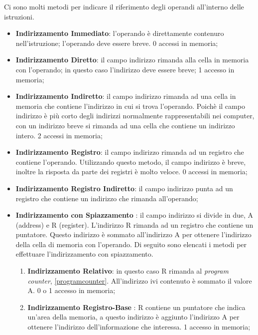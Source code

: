 \documentclass{article}
\begin{document}
Ci sono molti metodi per indicare il riferimento degli operandi all'interno delle istruzioni.
\begin{itemize}
	\item \textbf{Indirizzamento Immediato}: l'operando è direttamente contenuro nell'istruzione; l'operando deve essere breve. 0 accessi in memoria;

	\item \textbf{Indirizzamento Diretto}: il campo indirizzo rimanda alla cella in memoria con l'operando; in questo caso l'indirizzo deve essere breve; 1 accesso in memoria;

	\item \textbf{Indirizzamento Indiretto}: il campo indirizzo  rimanda ad una cella in memoria che contiene l'indirizzo in cui si trova l'operando. Poichè il campo indirizzo è più corto degli indirizzi normalmente rappresentabili nei computer, con un indirizzo breve si rimanda ad una cella che contiene un indirizzo intero. 2 accessi in memoria;

	\item \textbf{Indirizzamento Registro}: il campo indirizzo rimanda ad un registro che contiene l'operando. Utilizzando questo metodo, il campo indirizzo è breve, inoltre la risposta da parte dei registri è molto veloce. 0 accessi in memoria;

	\item \textbf{Indirizzamento Registro Indiretto}: il campo indirizzo punta ad un registro che contiene un indirizzo che rimanda all'operando;

	\item \textbf{Indirizzamento con Spiazzamento} \label{spiazzamento}: il campo indirizzo si divide in due, A (address) e R (register). L'indirizzo R rimanda ad un registro che contiene un puntatore. Questo indirizzo è sommato all'indirizzo A per ottenere l'indirizzo della cella di memoria con l'operando. Di seguito sono elencati i metodi per effettuare l'indirizzamento con spiazzamento.

	\begin{enumerate}
		\item \textbf{Indirizzamento Relativo}: in questo caso R rimanda al \textit{program counter}, \autoref{programcounter}. All'indirizzo ivi contenuto è sommato il valore A. 0 o 1 accesso in memoria;

		\item \textbf{Indirizzamento Registro-Base} \label{registrobase}: R contiene un puntatore che indica un'area della memoria, a questo indirizzo è aggiunto l'indirizzo A per ottenere l'indirizzo dell'informazione che interessa. 1 accesso in memoria;


\end{enumerate}
\end{itemize}
\end{document}
